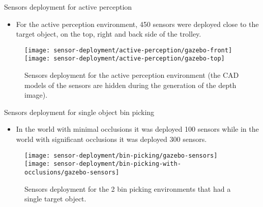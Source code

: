 \begin{frame}{Sensors deployment for active perception}
	\begin{itemize}
		\item For the active perception environment, 450 sensors were deployed close to the target object, on the top, right and back side of the trolley.
	\end{itemize}
	\begin{figure}
		\centering
		\texttt{[image: sensor-deployment/active-perception/gazebo-front]}
		\texttt{[image: sensor-deployment/active-perception/gazebo-top]}
		\caption{Sensors deployment for the active perception environment (the CAD models of the sensors are hidden during the generation of the depth image).}
	\end{figure}
\end{frame}


\begin{frame}{Sensors deployment for single object bin picking}
	\begin{itemize}
		\item In the world with minimal occlusions it was deployed 100 sensors while in the world with significant occlusions it was deployed 300 sensors.
	\end{itemize}
	\begin{figure}
		\centering
		\texttt{[image: sensor-deployment/bin-picking/gazebo-sensors]}\hspace{3em}
		\texttt{[image: sensor-deployment/bin-picking-with-occlusions/gazebo-sensors]}
		\caption{Sensors deployment for the 2 bin picking environments that had a single target object.}
	\end{figure}
\end{frame}


